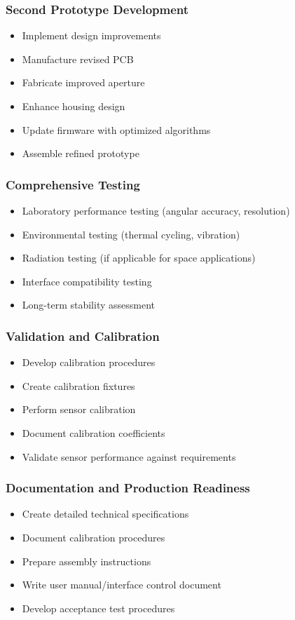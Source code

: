 \subsubsection*{Second Prototype Development}
\begin{itemize}
  \item Implement design improvements
  \item Manufacture revised PCB
  \item Fabricate improved aperture
  \item Enhance housing design
  \item Update firmware with optimized algorithms
  \item Assemble refined prototype
\end{itemize}

\subsubsection*{Comprehensive Testing}
\begin{itemize}
  \item Laboratory performance testing (angular accuracy, resolution)
  \item Environmental testing (thermal cycling, vibration)
  \item Radiation testing (if applicable for space applications)
  \item Interface compatibility testing
  \item Long-term stability assessment
\end{itemize}

\subsubsection*{Validation and Calibration}
\begin{itemize}
  \item Develop calibration procedures
  \item Create calibration fixtures
  \item Perform sensor calibration
  \item Document calibration coefficients
  \item Validate sensor performance against requirements
\end{itemize}

\subsubsection*{Documentation and Production Readiness}
\begin{itemize}
  \item Create detailed technical specifications
  \item Document calibration procedures
  \item Prepare assembly instructions
  \item Write user manual/interface control document
  \item Develop acceptance test procedures
\end{itemize}

